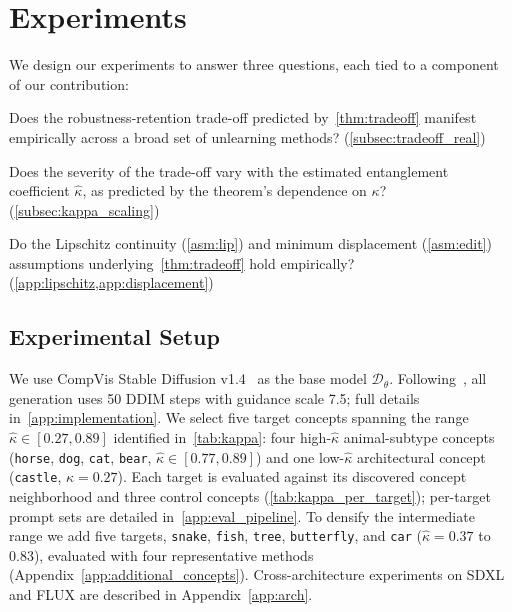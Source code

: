 \section{Experiments}
\label{sec:experiment}
We design our experiments to answer three questions, each tied to a component of our contribution:


\begin{squishenumerate}
    \item[\textbf{Q1.}] Does the robustness-retention trade-off predicted by~\cref{thm:tradeoff} manifest empirically across a broad set of unlearning methods? (\cref{subsec:tradeoff_real})
    \item[\textbf{Q2.}] Does the severity of the trade-off vary with the estimated entanglement coefficient $\hat\kappa$, as predicted by the theorem's dependence on $\kappa$? (\cref{subsec:kappa_scaling})
    \item[\textbf{Q3.}] Do the Lipschitz continuity (\cref{asm:lip}) and minimum displacement (\cref{asm:edit}) assumptions underlying~\cref{thm:tradeoff} hold empirically? (\cref{app:lipschitz,app:displacement})
\end{squishenumerate}


\subsection{Experimental Setup}
\label{subsec:setup}

We use CompVis Stable Diffusion v1.4~\citep{rombach2022high} as the base model $\mathcal{D}_\theta$. Following~\citep{gandikota2023erasing}, all generation uses 50 DDIM steps with guidance scale 7.5; 
full details in~\cref{app:implementation}.
We select five target concepts spanning the range $\hat\kappa \in [0.27, 0.89]$ identified in~\cref{tab:kappa}: 
four high-$\hat\kappa$ animal-subtype concepts (\texttt{horse}, \texttt{dog}, \texttt{cat}, \texttt{bear}, $\hat\kappa \in [0.77, 0.89]$) and one low-$\hat\kappa$ architectural concept (\texttt{castle}, $\hat\kappa = 0.27$). Each target is evaluated against its discovered concept neighborhood and three control concepts (\cref{tab:kappa_per_target}); per-target prompt sets are detailed in~\cref{app:eval_pipeline}.
To densify the intermediate range we add five targets, \texttt{snake}, \texttt{fish}, \texttt{tree}, \texttt{butterfly}, and \texttt{car} ($\hat\kappa=0.37$ to $0.83$), evaluated with four representative methods (Appendix~\ref{app:additional_concepts}). Cross-architecture experiments on SDXL and FLUX are described in Appendix~\ref{app:arch}.

